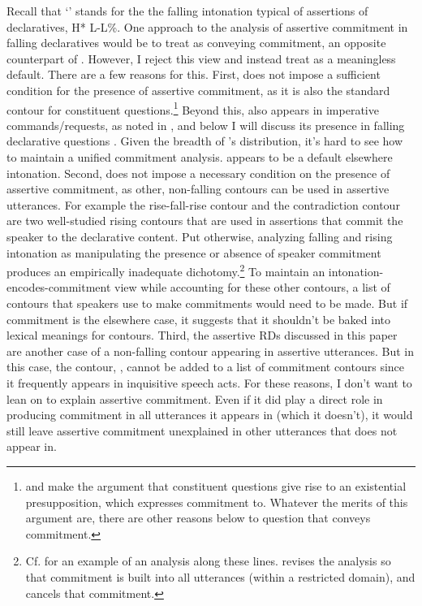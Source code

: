 \documentclass[output=paper,colorlinks,citecolor=brown]{langscibook}
\begin{document}
	Recall that `\fall' stands for the the falling intonation typical of assertions of declaratives, H* L-L\%. One approach to the analysis of assertive commitment in falling declaratives would be to treat \fall as conveying commitment, an opposite counterpart of \rise. However, I reject this view and instead treat \fall as a meaningless default. There are a few reasons for this. First, \fall does not impose a sufficient condition for the presence of assertive commitment, as it is also the standard contour for constituent questions.\footnote{\citet{bartels99} and \citet{truckenbrodt09} make the argument that constituent questions give rise to an existential presupposition, which \fall expresses commitment to. Whatever the merits of this argument are, there are other reasons below to question that \fall conveys commitment.} Beyond this, \fall also appears in imperative commands/requests, as noted in , and below I will discuss its presence in falling declarative questions \citep{bartels99, gunlogson08}. Given the breadth of \fall's distribution, it's hard to see how to maintain a unified commitment analysis. \fall appears to be a default elsewhere intonation. Second, \fall does not impose a necessary condition on the presence of assertive commitment, as other, non-falling contours can be used in assertive utterances. For example the rise-fall-rise contour \citep{ward85} and the contradiction contour \citep{liberman74} are two well-studied rising contours that are used in assertions that commit the speaker to the declarative content. Put otherwise, analyzing falling and rising intonation as manipulating the presence or absence of speaker commitment produces an empirically inadequate dichotomy.\footnote{Cf. \citet{rudin18} for an example of an analysis along these lines. \citet{rudin22} revises the analysis so that commitment is built into all utterances (within a restricted domain), and \rise cancels that commitment.} To maintain an intonation-encodes-commitment view while accounting for these other contours, a list of contours that speakers use to make commitments would need to be made. But if commitment is the elsewhere case, it suggests that it shouldn't be baked into lexical meanings for contours. Third, the assertive RDs discussed in this paper are another case of a non-falling contour appearing in assertive utterances. But in this case, the contour, \rise, cannot be added to a list of commitment contours since it frequently appears in inquisitive speech acts. For these reasons, I don't want to lean on \fall to explain assertive commitment. Even if it did play a direct role in producing commitment in all utterances it appears in (which it doesn't), it would still leave assertive commitment unexplained in other utterances that \fall does not appear in. 
	
\end{document}
